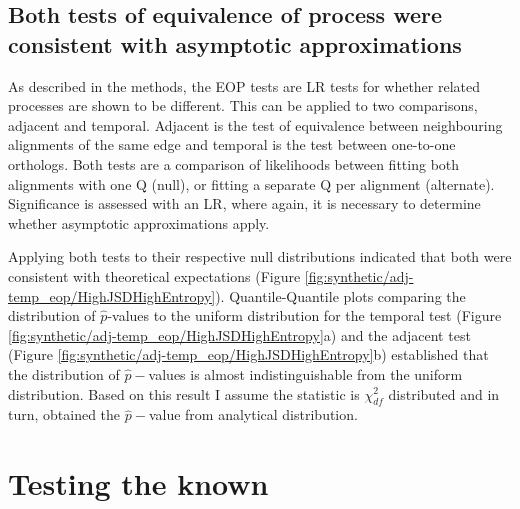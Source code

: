 

\subsection{Both tests of equivalence of process were consistent with asymptotic approximations}

 As described in the methods, the EOP tests are LR tests for whether related processes are shown to be different. This can be applied to two comparisons, adjacent and temporal. Adjacent is the test of equivalence between neighbouring alignments of the same edge and temporal is the test between one-to-one orthologs. Both tests are a comparison of likelihoods between fitting both alignments with one $\mathrm{Q}$ (null), or fitting a separate $\mathrm{Q}$ per alignment (alternate). Significance is assessed with an LR, where again, it is necessary to determine whether asymptotic approximations apply. 

Applying both tests to their respective null distributions indicated that both were consistent with theoretical expectations (Figure \ref{fig:synthetic/adj-temp_eop/HighJSDHighEntropy}). Quantile-Quantile plots comparing the distribution of $\hat p$-values to the uniform distribution for the temporal test (Figure \ref{fig:synthetic/adj-temp_eop/HighJSDHighEntropy}a) and the adjacent test (Figure \ref{fig:synthetic/adj-temp_eop/HighJSDHighEntropy}b) established that the distribution of $\hat p-$values is almost indistinguishable from the uniform distribution. Based on this result I assume the statistic is $\chi^2_{df}$ distributed and in turn, obtained the $\hat p-$value from analytical distribution. 



\section{Testing the known}

